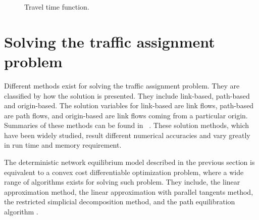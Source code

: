 \begin{figure}[!ht]
    \centering
    \caption{Travel time function.}
    \label{fig:flowfunction}
\end{figure}

\section{Solving the traffic assignment problem}

Different methods exist for solving the traffic assignment problem.
They are classified by how the solution is presented.
They include link-based, path-based and origin-based.
The solution variables for link-based are link flows,
path-based are path flows,
and origin-based are link flows coming from a particular origin.
Summaries of these methods can be found in ~\citet{Zhou2010}.
These solution methods, which have been widely studied,
result different numerical accuracies and vary greatly in run time and memory requirement.

The deterministic network equilibrium model described in the previous section is equivalent to a convex cost differentiable optimization problem,
where a wide range of algorithms exists for solving such problem.
They include, the linear approximation method,
the linear approximation with parallel tangents method,
the restricted simplicial decomposition method,
and the path equilibration algorithm \citep{Florian}.

